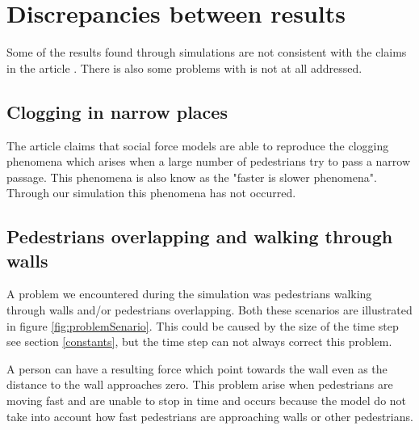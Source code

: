 \section{Discrepancies between results}
\label{sec:discrepancies}
Some of the results found through simulations are not consistent with the claims in the article \cite{self-org}. There is also some problems with is not at all addressed.

\subsection{Clogging in narrow places}
The article \cite{self-org} claims that social force models are able to reproduce the clogging phenomena which arises when a large number of pedestrians try to pass a narrow passage. This phenomena is also know as the "faster is slower phenomena". Through our simulation this phenomena has not occurred.



\subsection{Pedestrians overlapping and walking through walls}
A problem we encountered during the simulation was pedestrians walking through walls and/or pedestrians overlapping. Both these scenarios are illustrated in figure \ref{fig:problemSenario}. This could be caused by the size of the time step see section \ref{constants}, but the time step can not always correct this problem.

A person can have a resulting force which point towards the wall even as the distance to the wall approaches zero. This problem arise when pedestrians are moving fast and are unable to stop in time and occurs because the model do not take into account how fast pedestrians are approaching walls or other pedestrians.

